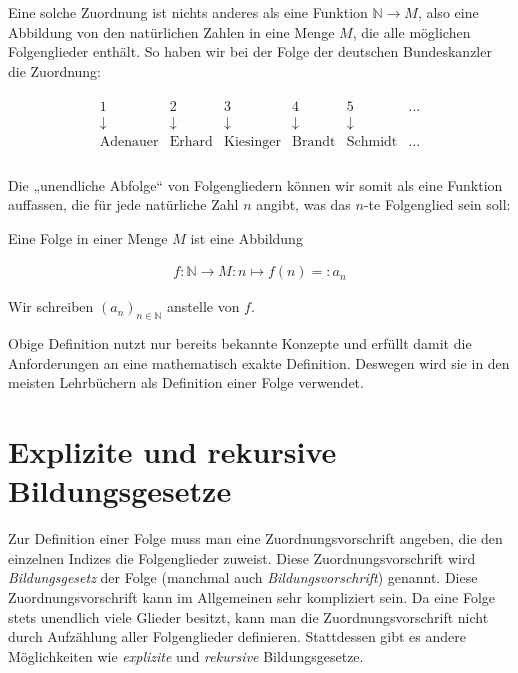 \documentclass[fontsize=9pt,
               parskip=half-,
               DIV=14,
               listof=chapterentry,
               tocflat]{scrbook}
\begin{document}
Eine solche Zuordnung ist nichts anderes als eine Funktion $\mathbb {N} \rightarrow M$, also eine Abbildung von den natürlichen Zahlen in eine Menge $M$, die alle möglichen Folgenglieder enthält. So haben wir bei der Folge der deutschen Bundeskanzler die Zuordnung:

\begin{align*}
{\begin{array}{cccccl}1&2&3&4&5&\ldots \\\downarrow &\downarrow &\downarrow &\downarrow &\downarrow &\\{\text{Adenauer}}&{\text{Erhard}}&{\text{Kiesinger}}&{\text{Brandt}}&{\text{Schmidt}}&\ldots \\\end{array}}
\end{align*}

Die „unendliche Abfolge“ von Folgengliedern können wir somit als eine Funktion auffassen, die für jede natürliche Zahl $n$ angibt, was das $n$-te Folgenglied sein soll:

\begin{definition*}[Folge]
Eine Folge in einer Menge $M$ ist eine Abbildung

\begin{align*}
f:\mathbb {N} \to M:n\mapsto f(n)=:a_{n}
\end{align*}

Wir schreiben $(a_{n})_{n\in \mathbb {N} }$ anstelle von $f$.

\end{definition*}

Obige Definition nutzt nur bereits bekannte Konzepte und erfüllt damit die Anforderungen an eine mathematisch exakte Definition. Deswegen wird sie in den meisten Lehrbüchern als Definition einer Folge verwendet.

\chapter{Explizite und rekursive Bildungsgesetze}

Zur Definition einer Folge muss man eine Zuordnungsvorschrift angeben, die den einzelnen Indizes die Folgenglieder zuweist. Diese Zuordnungsvorschrift wird \emph{Bildungsgesetz} der Folge (manchmal auch \emph{Bildungsvorschrift}) genannt. Diese Zuordnungsvorschrift kann im Allgemeinen sehr kompliziert sein. Da eine Folge stets unendlich viele Glieder besitzt, kann man die Zuordnungsvorschrift nicht durch Aufzählung aller Folgenglieder definieren. Stattdessen gibt es andere Möglichkeiten wie \emph{explizite} und \emph{rekursive} Bildungsgesetze.
\end{document}

